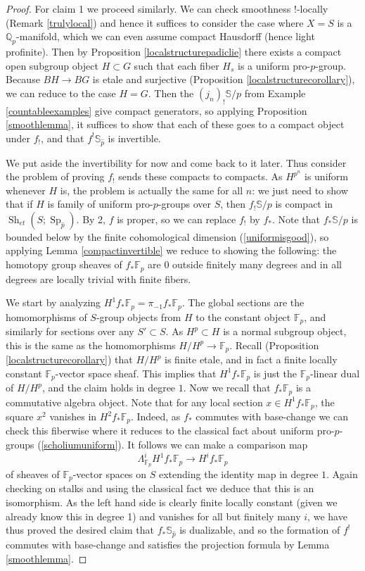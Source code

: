 \documentclass[12pt]{article}
\newcommand{\on}{\operatorname}
\newcommand{\mbb}{\mathbb}
\newcommand{\wh}{\widehat}
\begin{document}
\begin{proof}
For claim 1 we proceed similarly.  We can check smoothness $!$-locally (Remark \ref{trulylocal}) and hence it suffices to consider the case where $X=S$ is a $\mathbb{Q}_p$-manifold, which we can even assume compact Hausdorff (hence light profinite).  Then by Proposition \ref{localstructurepadiclie} there exists a compact open subgroup object $H\subset G$ such that each fiber $H_s$ is a uniform pro-$p$-group.  Because $BH\to BG$ is etale and surjective (Proposition \ref{localstructurecorollary}), we can reduce to the case $H=G$.  Then the $(j_n)_!\mbb{S}/p$ from Example \ref{countableexamples} give compact generators, so applying Proposition \ref{smoothlemma}, it suffices to show that each of these goes to a compact object under $f_!$, and that $f^!\mbb{S}_{\wh{p}}$ is invertible.

We put aside the invertibility for now and come back to it later. Thus consider the problem of proving $f_!$ sends these compacts to compacts.  As $H^{p^n}$ is uniform whenever $H$ is, the problem is actually the same for all $n$: we just need to show that if $H$ is family of uniform pro-$p$-groups over $S$, then $f_!\mbb{S}/p$ is compact in $\on{Sh}_{et}(S;\on{Sp}_{\wh{p}})$.  By 2, $f$ is proper, so we can replace $f_!$ by $f_\ast$.  Note that $f_\ast\mbb{S}/p$ is bounded below by the finite cohomological dimension (\ref{uniformisgood}), so applying Lemma \ref{compactinvertible} we reduce to showing the following: the homotopy group sheaves of $f_\ast \mbb{F}_p$ are $0$ outside finitely many degrees and in all degrees are locally trivial with finite fibers.

We start by analyzing $H^1 f_\ast \mbb{F}_p = \pi_{-1}f_\ast \mbb{F}_p$.  The global sections are the homomorphisms of $S$-group objects from $H$ to the constant object $\mbb{F}_p$, and similarly for sections over any $S'\subset S$.  As $H^p\subset H$ is a normal subgroup object, this is the same as the homomorphisms $H/H^p\to \mathbb{F}_p$.  Recall (Proposition \ref{localstructurecorollary}) that $H/H^p$ is finite etale, and in fact a finite locally constant $\mbb{F}_p$-vector space sheaf.  This implies that $H^1 f_\ast \mbb{F}_p$ is just the $\mbb{F}_p$-linear dual of $H/H^p$, and the claim holds in degree $1$.  Now we recall that $f_\ast\mbb{F}_p$ is a commutative algebra object.  Note that for any local section $x\in H^1 f_\ast \mbb{F}_p$, the square $x^2$ vanishes in $H^2 f_\ast \mbb{F}_p$.  Indeed, as $f_\ast$ commutes with base-change we can check this fiberwise where it reduces to the classical fact about uniform pro-$p$-groups (\ref{scholiumuniform}).  It follows we can make a comparison map
$$\Lambda^i_{\mbb{F}_p} H^1f_\ast\mbb{F}_p \to H^if_\ast \mbb{F}_p$$
of sheaves of $\mbb{F}_p$-vector spaces on $S$ extending the identity map in degree $1$.  Again checking on stalks and using the classical fact we deduce that this is an isomorphism.  As the left hand side is clearly finite locally constant (given we already know this in degree 1) and vanishes for all but finitely many $i$, we have thus proved the desired claim that $f_\ast\mbb{S}_{\wh{p}}$ is dualizable, and so the formation of $f^!$ commutes with base-change and satisfies the projection formula by Lemma \ref{smoothlemma}.


\end{proof}
\end{document}
